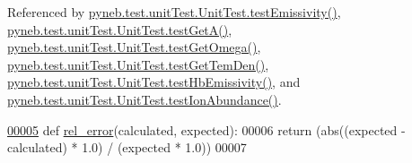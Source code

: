 Referenced by \hyperlink{unit_test_8py_source_l00023}{pyneb.\+test.\+unit\+Test.\+Unit\+Test.\+test\+Emissivity()}, \hyperlink{unit_test_8py_source_l00090}{pyneb.\+test.\+unit\+Test.\+Unit\+Test.\+test\+Get\+A()}, \hyperlink{unit_test_8py_source_l00100}{pyneb.\+test.\+unit\+Test.\+Unit\+Test.\+test\+Get\+Omega()}, \hyperlink{unit_test_8py_source_l00111}{pyneb.\+test.\+unit\+Test.\+Unit\+Test.\+test\+Get\+Tem\+Den()}, \hyperlink{unit_test_8py_source_l00066}{pyneb.\+test.\+unit\+Test.\+Unit\+Test.\+test\+Hb\+Emissivity()}, and \hyperlink{unit_test_8py_source_l00076}{pyneb.\+test.\+unit\+Test.\+Unit\+Test.\+test\+Ion\+Abundance()}.


\begin{DoxyCode}
\hypertarget{namespacepyneb_1_1test_1_1unit_test_l00005}{}\hyperlink{namespacepyneb_1_1test_1_1unit_test_aff3b7f847905c444d8b10727f10de236}{00005} \textcolor{keyword}{def }\hyperlink{namespacepyneb_1_1test_1_1unit_test_aff3b7f847905c444d8b10727f10de236}{rel\_error}(calculated, expected):
00006         \textcolor{keywordflow}{return} (abs((expected - calculated) * 1.0) / (expected * 1.0))
00007 
\end{DoxyCode}
